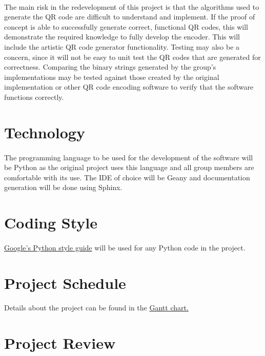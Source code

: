 \documentclass{article}
\begin{document}
	\paragraph{}
	
		The main risk in the redevelopment of this project is that the 
		algorithms used to generate the QR code are difficult to understand and 
		implement. If the proof of concept is able to successfully generate 
		correct, functional QR codes, this will demonstrate the required 
		knowledge to fully develop the encoder. This will include the artistic 
		QR code generator functionality. Testing may also be a concern, since 
		it will not be easy to unit test the QR codes that are generated for 
		correctness. Comparing the binary strings generated by the group's 
		implementations may be tested against those created by the original 
		implementation or other QR code encoding software to verify that the 
		software functions correctly.

\section{Technology}

	\paragraph{}
		
		The programming language to be used for the development of the software 
		will be Python as the original project uses this language and all group 
		members are comfortable with its use. The IDE of choice will be Geany 
		and documentation generation will be done using Sphinx.

\section{Coding Style}

	\paragraph{}
	
		\href{https://google.github.io/styleguide/pyguide.html}{Google's Python 
		style guide} will be used for any Python code in the project.
	
\section{Project Schedule}

	\paragraph{}
		
		Details about the project can be found in the 
		\href{https://gitlab.cas.mcmaster.ca/schiotek/Q-aRt_Code/tree/master/ProjectSchedule/GanttChartQ.gan}{Gantt
		 chart.}
		
\section{Project Review}
\end{document}
